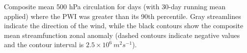 \label{fig:pwi_spatial_summary}
Composite mean 500 hPa circulation for days (with 30-day running mean applied) where the PWI was greater than its 90th percentile. Gray streamlines indicate the direction of the wind, while the black contours show the composite mean streamfunction zonal anomaly (dashed contours indicate negative values and the contour interval is $2.5 \times 10^6 \: m^2 s^{-1}$). 